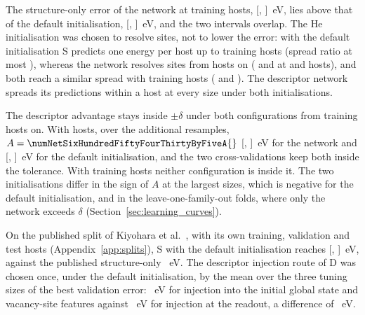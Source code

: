 The structure-only error of the network at \numNetSixHundredFiftyFourHosts{} training hosts, \numNetSixHundredFiftyFourMaeS{} [\numNetSixHundredFiftyFourMaeSLo{}, \numNetSixHundredFiftyFourMaeSHi{}]~eV, lies above that of the default initialisation, \numAblSixHundredFiftyFourMaeS{} [\numAblSixHundredFiftyFourMaeSLo{}, \numAblSixHundredFiftyFourMaeSHi{}]~eV, and the two intervals overlap. The He initialisation was chosen to resolve sites, not to lower the error: with the default initialisation S predicts one energy per host up to \numCfgBudgetsHostsItemFour{} training hosts (spread ratio at most \numAblSpreadRatioSFifty{}), whereas the network resolves sites from \numCfgBudgetsHostsItemThree{} hosts on (\numNetSpreadRatioSOneHundred{} and \numNetSpreadRatioSTwoHundred{} at \numCfgBudgetsHostsItemThree{} and \numCfgBudgetsHostsItemFour{} hosts), and both reach a similar spread with \numCfgBudgetsMax{} training hosts (\numNetSpreadRatioSSixHundredFiftyFour{} and \numAblSpreadRatioSSixHundredFiftyFour{}). The descriptor network spreads its predictions within a host at every size under both initialisations.

The descriptor advantage stays inside $\pm\delta$ under both configurations from \numCfgBudgetsMax{} training hosts on. With \numCfgBudgetsMax{} hosts, over the additional resamples, $A = \numNetSixHundredFiftyFourThirtyByFiveA{}$ [\numNetSixHundredFiftyFourThirtyByFiveALo{}, \numNetSixHundredFiftyFourThirtyByFiveAHi{}]~eV for the network and \numAblSixHundredFiftyFourThirtyByFiveA{} [\numAblSixHundredFiftyFourThirtyByFiveALo{}, \numAblSixHundredFiftyFourThirtyByFiveAHi{}]~eV for the default initialisation, and the two cross-validations keep both inside the tolerance. With \numCfgBudgetsHostsItemFive{} training hosts neither configuration is inside it. The two initialisations differ in the sign of $A$ at the largest sizes, which is negative for the default initialisation, and in the leave-one-family-out folds, where only the network exceeds $\delta$ (Section~\ref{sec:learning_curves}).

On the published split of Kiyohara et al.\ \citep{Kiyohara2025machinelearning}, with its own training, validation and test hosts (Appendix~\ref{app:splits}), S with the default initialisation reaches \numAblKiyoharaMaeS{} [\numAblKiyoharaMaeSLo{}, \numAblKiyoharaMaeSHi{}]~eV, against the published structure-only \numNetPublishedMae{}~eV. The descriptor injection route of D was chosen once, under the default initialisation, by the mean over the three tuning sizes of the best validation error: \numTuningSummaryDecisionMeansEVDState{}~eV for injection into the initial global state and vacancy-site features against \numTuningSummaryDecisionMeansEVDLate{}~eV for injection at the readout, a difference of \numTuningSummaryDecisionDifferenceEV{}~eV.

